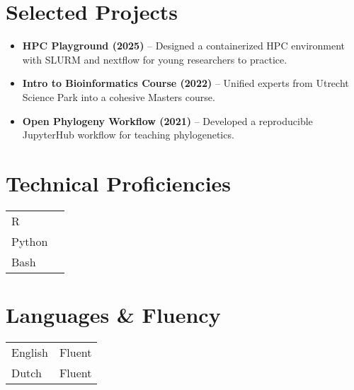 \documentclass[a4paper,10pt]{article}
\begin{document}
\section*{Selected Projects}
\begin{itemize}
  \item \textbf{HPC Playground (2025)} – Designed a containerized HPC environment with SLURM and nextflow for young researchers to practice.
  \item \textbf{Intro to Bioinformatics Course (2022)} – Unified experts from Utrecht Science Park into a cohesive Masters course.
  \item \textbf{Open Phylogeny Workflow (2021)} – Developed a reproducible JupyterHub workflow for teaching phylogenetics. 
\end{itemize}



\MySkip

\begin{multicols}{2}
\section*{Technical Proficiencies}
\begin{tabular}{ll}
  R       & \SkillBull{$\bullet\bullet\bullet\bullet$} \\
  Python  & \SkillBull{$\bullet\bullet\bullet\bullet$} \\
  Bash    & \SkillBull{$\bullet\bullet\bullet\circ$} \\
\end{tabular}

\vfill\null \columnbreak

\section*{Languages \& Fluency}
\begin{tabular}{ll}
  English & Fluent \\
  Dutch   & Fluent \\
\end{tabular}

\end{multicols}

\end{document}
